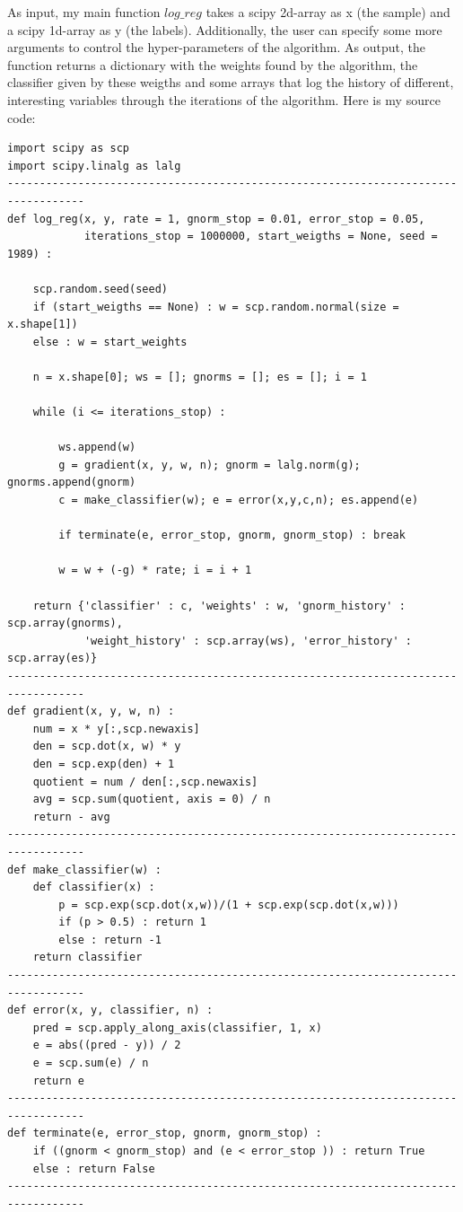 As input, my main function $log\_reg$ takes a scipy 2d-array as x (the sample) and a scipy 1d-array as y (the labels). Additionally, the user can specify some more arguments to control the hyper-parameters of the algorithm. As output, the function returns a dictionary with the weights found by the algorithm, the classifier given by these weigths and some arrays that log the history of different, interesting variables through the iterations of the algorithm. Here is my source code:
\begin{Verbatim}[fontsize = \relsize{-2}]
import scipy as scp
import scipy.linalg as lalg
----------------------------------------------------------------------------------
def log_reg(x, y, rate = 1, gnorm_stop = 0.01, error_stop = 0.05,
            iterations_stop = 1000000, start_weigths = None, seed = 1989) :
    
    scp.random.seed(seed)
    if (start_weigths == None) : w = scp.random.normal(size = x.shape[1])
    else : w = start_weights
    
    n = x.shape[0]; ws = []; gnorms = []; es = []; i = 1
    
    while (i <= iterations_stop) : 
    
        ws.append(w)
        g = gradient(x, y, w, n); gnorm = lalg.norm(g); gnorms.append(gnorm)
        c = make_classifier(w); e = error(x,y,c,n); es.append(e)
        
        if terminate(e, error_stop, gnorm, gnorm_stop) : break
        
        w = w + (-g) * rate; i = i + 1
    
    return {'classifier' : c, 'weights' : w, 'gnorm_history' : scp.array(gnorms), 
            'weight_history' : scp.array(ws), 'error_history' : scp.array(es)}
----------------------------------------------------------------------------------
def gradient(x, y, w, n) :
    num = x * y[:,scp.newaxis]
    den = scp.dot(x, w) * y
    den = scp.exp(den) + 1
    quotient = num / den[:,scp.newaxis]
    avg = scp.sum(quotient, axis = 0) / n
    return - avg
----------------------------------------------------------------------------------
def make_classifier(w) :
    def classifier(x) :
        p = scp.exp(scp.dot(x,w))/(1 + scp.exp(scp.dot(x,w)))
        if (p > 0.5) : return 1
        else : return -1
    return classifier
----------------------------------------------------------------------------------
def error(x, y, classifier, n) :
    pred = scp.apply_along_axis(classifier, 1, x)
    e = abs((pred - y)) / 2
    e = scp.sum(e) / n
    return e
----------------------------------------------------------------------------------
def terminate(e, error_stop, gnorm, gnorm_stop) :
    if ((gnorm < gnorm_stop) and (e < error_stop )) : return True
    else : return False
----------------------------------------------------------------------------------
\end{Verbatim}


